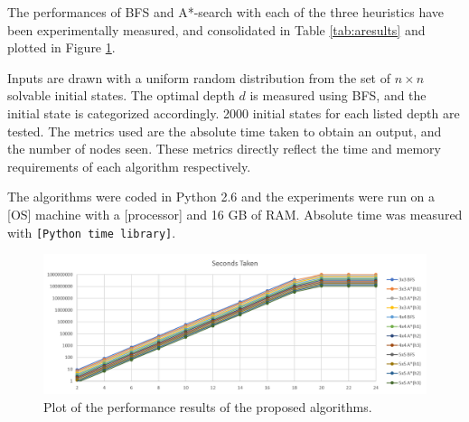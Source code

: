 \documentclass[runningheads]{llncs}
\begin{document}
The performances of BFS and A*-search with each of the three heuristics have been experimentally measured, and consolidated in Table \ref{tab:aresults} and plotted in Figure \ref{fig:results}.

Inputs are drawn with a uniform random distribution from the set of $n \times n$ solvable initial states. The optimal depth $d$ is measured using BFS, and the initial state is categorized accordingly. 2000 initial states for each listed depth are tested.
The metrics used are the absolute time taken to obtain an output, and the number of nodes seen. These metrics directly reflect the time and memory requirements of each algorithm respectively.

The algorithms were coded in Python 2.6 and the experiments were run on a [OS] machine with a [processor] and 16 GB of RAM. Absolute time was measured with \texttt{[Python time library]}.

\begin{figure}[h!]
	\centering
	\includegraphics[width=\textwidth]{results_time.png}
	\caption{Plot of the performance results of the proposed algorithms.} \label{fig:results}
\end{figure}
\end{document}
